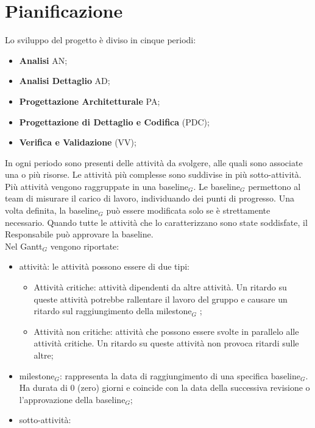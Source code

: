 \chapter{Pianificazione}
Lo sviluppo del progetto è diviso in cinque periodi:
\begin{itemize}
    \item \textbf{Analisi} AN;
    \item \textbf{Analisi Dettaglio} AD;
    \item \textbf{Progettazione Architetturale} PA;
    \item \textbf{Progettazione di Dettaglio e Codifica} (PDC);
    \item \textbf{Verifica e Validazione} (VV);
\end{itemize}
In ogni periodo sono presenti delle attività da svolgere, alle quali sono associate una o più risorse.
Le attività più complesse sono suddivise in più sotto-attività.\\Più attività vengono raggruppate in una baseline$_{G}$. Le baseline$_{G}$ permettono al team di misurare il carico di lavoro, individuando dei punti di progresso. Una volta definita, la baseline$_{G}$ può essere modificata solo se è strettamente necessario. Quando tutte le attività che lo caratterizzano sono state soddisfate, il Responsabile può approvare la baseline.\\
Nel Gantt$_{G}$ vengono riportate:
\begin{itemize}
    \item attività: le attività possono essere di due tipi:
    \begin{itemize}
        \item Attività critiche: attività dipendenti da altre attività. Un ritardo su queste attività potrebbe rallentare il lavoro del gruppo e causare un ritardo sul raggiungimento della milestone$_{G}$ ;
        \item Attività non critiche: attività che possono essere svolte in parallelo alle attività critiche. Un ritardo su queste attività non provoca ritardi sulle altre;
    \end{itemize}
    \item milestone$_{G}$: rappresenta la data di raggiungimento di una specifica baseline$_{G}$. Ha durata di 0 (zero) giorni e coincide con la data della successiva revisione o l'approvazione della baseline$_{G}$;
    \item sotto-attività:
\end{itemize}